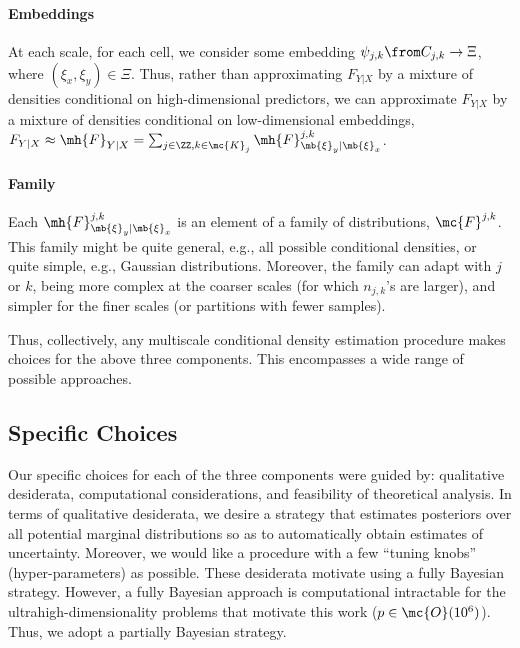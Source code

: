 \paragraph{Embeddings}
At each scale, for each cell, we consider some embedding $\psi_{j,k} \from C_{j,k} \to \Xi$, where $(\xi_x,\xi_y) \in \Xi$.  Thus, rather than approximating $F_{Y|X}$ by a mixture of densities conditional on high-dimensional predictors, we can approximate $F_{Y|X}$ by a mixture of densities conditional on low-dimensional embeddings,  $F_{Y|X} \approx \mh{F}_{Y|X} = \sum_{j \in \ZZ, k \in \mc{K}_j} \mh{F}^{j,k}_{\mb{\xi}_y| \mb{\xi}_x}$.   

\paragraph{Family} Each $\mh{F}^{j,k}_{\mb{\xi}_y | \mb{\xi}_x}$ is an element of a family of distributions, $\mc{F}^{j,k}$.  This family might be quite general, e.g., all possible conditional densities, or quite simple, e.g., Gaussian distributions.  Moreover, the family can adapt with $j$ or $k$, being more complex at the coarser scales (for which $n_{j,k}$'s are larger), and simpler for the finer scales (or partitions with fewer samples).


Thus, collectively, any multiscale conditional density estimation procedure makes choices for the above three components.  This encompasses a wide range of possible approaches. 



\subsection{Specific Choices} \label{sub:spec}

Our specific choices for each of the three components were guided by: qualitative desiderata, computational considerations, and feasibility of theoretical analysis.  In terms of qualitative desiderata, we desire a strategy that estimates posteriors over all potential marginal distributions so as to automatically obtain estimates of uncertainty.  Moreover, we would like a procedure with a few ``tuning knobs'' (hyper-parameters) as possible.  These desiderata motivate using a fully Bayesian strategy.  
However, a fully Bayesian approach is computational intractable for the ultrahigh-dimensionality problems that motivate this work ($ p \in \mc{O}(10^6)$).  Thus, we adopt a partially Bayesian strategy.  

